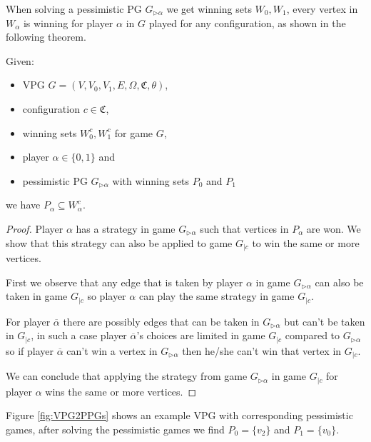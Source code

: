 When solving a pessimistic PG $G_{\triangleright\alpha}$ we get winning sets $W_0,W_1$, every vertex in $W_\alpha$ is winning for player $\alpha$ in $G$ played for any configuration, as shown in the following theorem.
\begin{theorem}
	\label{the_pess_is_winning_for_all_conf}
	Given:
	\begin{itemize}
		\item VPG $G = (V,V_0,V_1,E,\Omega,\mathfrak{C},\theta)$,
		\item configuration $c \in \mathfrak{C}$,
		\item winning sets $W_0^c, W_1^c$ for game $G$,
		\item player $\alpha \in \{0,1\}$ and
		\item pessimistic PG $G_{\triangleright\alpha}$ with winning sets $P_0$ and $P_1$
	\end{itemize}
	we have $P_\alpha \subseteq W_\alpha^c$.
	\begin{proof}
		Player $\alpha$ has a strategy in game $G_{\triangleright\alpha}$ such that vertices in $P_\alpha$ are won. We show that this strategy can also be applied to game $G_{|c}$ to win the same or more vertices.
		
		First we observe that any edge that is taken by player $\alpha$ in game $G_{\triangleright\alpha}$ can also be taken in game $G_{|c}$ so player $\alpha$ can play the same strategy in game $G_{|c}$.
		
		For player $\overline{\alpha}$ there are possibly edges that can be taken in $G_{\triangleright\alpha}$ but can't be taken in $G_{|c}$, in such a case player $\overline{\alpha}$'s choices are limited in game $G_{|c}$ compared to $G_{\triangleright\alpha}$ so if player $\overline{\alpha}$ can't win a vertex in $G_{\triangleright\alpha}$ then he/she can't win that vertex in $G_{|c}$.
		
		We can conclude that applying the strategy from game $G_{\triangleright\alpha}$ in game $G_{|c}$ for player $\alpha$ wins the same or more vertices.
	\end{proof}
\end{theorem}
Figure \ref{fig:VPG2PPGs} shows an example VPG with corresponding pessimistic games, after solving the pessimistic games we find $P_0 = \{v_2\}$ and $P_1 = \{v_0\}$.
